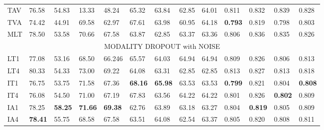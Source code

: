 \documentclass[a4paper,conference]{IEEEtran}
\begin{document}
\begin{table}[h]
\begin{tabular}{|p{12pt}|p{12pt}p{13pt}p{13pt}p{14pt}|p{12pt}p{13pt}p{13pt}p{14pt}|p{12pt}p{13pt}p{13pt}p{14pt}|}
\multicolumn{1}{|l|}{TAV}      & 76.58          & 54.83          & 13.33          & {48.24}          & 65.32          & 63.84        & 62.85           & {64.01}          & 0.811          & 0.832          & 0.839          & {0.828}          \\
\multicolumn{1}{|l|}{TVA}      & 74.42          & 44.91          & 69.58          & {62.97}          & 67.61        & 63.98          & 60.95           & {64.18}          & \textbf{0.793}          & 0.819          & 0.798          & {0.803}          \\
\multicolumn{1}{|l|}{MLT}     & 78.50          & 53.58          & 70.66          & {67.58}          & 63.87          & 62.85          & 63.37           & {63.36}          & 0.806 & 0.836          & 0.835          & {0.826}          \\ \hline \multicolumn{13}{c}{MODALITY DROPOUT with NOISE}                                         \\ \hline
\multicolumn{1}{|l|}{LT1} & 77.08          & 53.16          & 68.50          & {66.246}         & 65.57          & 64.03          & 64.94           & {64.94}          & 0.809          & 0.826          & 0.806          & {0.813}          \\
\multicolumn{1}{|l|}{LT4} & 80.33          & 54.33          & 73.00          & {69.22}          & 64.08          & 63.31          & 62.85           & {62.85}          & 0.813          & 0.827          & 0.813          & {0.818}          \\
\multicolumn{1}{|l|}{IT1}    & 76.75          & 53.75          & 71.58          & {67.36}          & \textbf{68.16} & \textbf{65.98} & 63.53           & {63.53}          & \textbf{0.799} & 0.821          & 0.804          & {\textbf{0.808}} \\
\multicolumn{1}{|l|}{IT4}    & 76.08          & 54.50          & 71.00          & {67.19}          & 67.83          & 63.56          & 64.22           & {64.22}          & 0.801          & 0.826          & \textbf{0.802} & {0.809}          \\
\multicolumn{1}{|l|}{IA1}    & 78.25          & \textbf{58.25} & \textbf{71.66} & {\textbf{69.38}} & 62.76          & 63.89          & 63.18           & {63.27}          & 0.804          & \textbf{0.819} & 0.805          & {0.809}          \\
\multicolumn{1}{|l|}{IA4}    & \textbf{78.41} & 55.75          & 68.58          & {67.58}          & 63.51          & 64.08          & 62.54           & {63.37}          & 0.805          & 0.820          & 0.808          & {0.811}          \\

\end{tabular}
\end{table}
\end{document}
